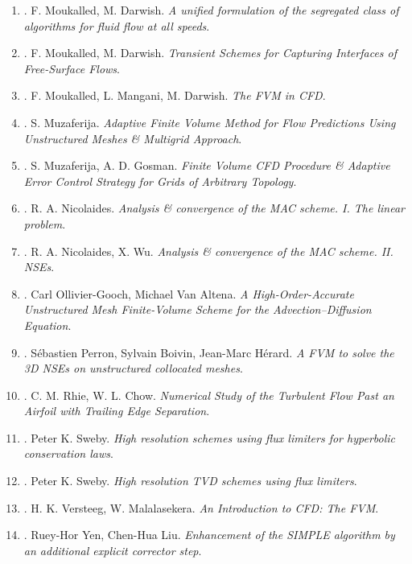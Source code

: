 \documentclass{article}
\begin{document}
\begin{enumerate}
	\item \cite{Moukalled_Darwish2000}. {\sc F. Moukalled, M. Darwish}. {\it A unified formulation of the segregated class of algorithms for fluid flow at all speeds}.
	\item \cite{Moukalled_Darwish2012}. {\sc F. Moukalled, M. Darwish}. {\it Transient Schemes for Capturing Interfaces of Free-Surface Flows}.
	\item \cite{Moukalled_Mangani_Darwish2016}. {\sc F. Moukalled, L. Mangani, M. Darwish}. {\it The FVM in CFD}.
	\item \cite{Muzaferija1994}. {\sc S. Muzaferija}. {\it Adaptive Finite Volume Method for Flow Predictions Using Unstructured Meshes \& Multigrid Approach}.
	\item \cite{Muzaferija_Gosman1997}. {\sc S. Muzaferija, A. D. Gosman}. {\it Finite Volume CFD Procedure \& Adaptive Error Control Strategy for Grids of Arbitrary Topology}.
	\item \cite{Nicolaides1992}. {\sc R. A. Nicolaides}. {\it Analysis \& convergence of the {MAC} scheme. I. The linear problem}.
	\item \cite{Nicolaides_Wu1996}. {\sc R. A. Nicolaides, X. Wu}. {\it Analysis \& convergence of the MAC scheme. II. NSEs}.
	\item \cite{Ollivier-Gooch_Altena2002}. {\sc Carl Ollivier-Gooch, Michael Van Altena}. {\it A High-Order-Accurate Unstructured Mesh Finite-Volume Scheme for the Advection--Diffusion Equation}.
	\item \cite{Perron_Boivin_Herard2004}. {\sc S\'{e}bastien Perron, Sylvain Boivin, Jean-Marc H\'{e}rard}. {\it A FVM to solve the 3D NSEs on unstructured collocated meshes}.
	\item \cite{Rhie_Chow1983}. {\sc C. M. Rhie, W. L. Chow}. {\it Numerical Study of the Turbulent Flow Past an Airfoil with Trailing Edge Separation}.
	\item \cite{Sweby1984}. {\sc Peter K. Sweby}. {\it High resolution schemes using flux limiters for hyperbolic conservation laws}.
	\item \cite{Sweby1985}. {\sc Peter K. Sweby}. {\it High resolution TVD schemes using flux limiters}.
	\item \cite{Versteeg_Malalasekera2007}. {\sc H. K. Versteeg, W. Malalasekera}. {\it An Introduction to CFD: The FVM}.
	\item \cite{Yen_Liu1993}. {\sc Ruey-Hor Yen, Chen-Hua Liu}. {\it Enhancement of the SIMPLE algorithm by an additional explicit corrector step}.
\end{enumerate}
\end{document}
